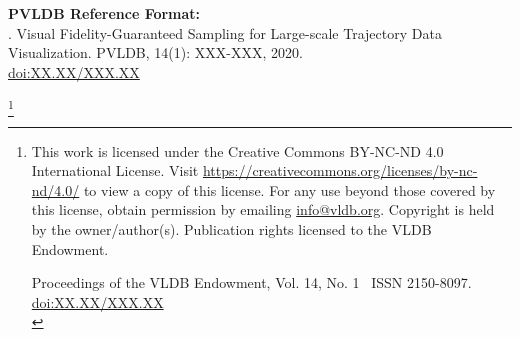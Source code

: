 \documentclass[sigconf, nonacm]{acmart}
\newcommand\vldbdoi{XX.XX/XXX.XX}
\newcommand\vldbpages{XXX-XXX}
\newcommand\vldbvolume{14}
\newcommand\vldbissue{1}
\newcommand\vldbyear{2020}
\newcommand{\trim}{\vspace{-2mm}}
\begin{document}
\maketitle

\trim \trim

\begingroup\small\noindent\raggedright\textbf{PVLDB Reference Format:}\\
\shortauthors. Visual Fidelity-Guaranteed Sampling for Large-scale Trajectory Data Visualization. PVLDB, \vldbvolume(\vldbissue): \vldbpages, \vldbyear.\\
\href{https://doi.org/\vldbdoi}{doi:\vldbdoi}
\endgroup

\trim \trim %

\begingroup
\renewcommand\thefootnote{}\footnote{\noindent
This work is licensed under the Creative Commons BY-NC-ND 4.0 International License. Visit \url{https://creativecommons.org/licenses/by-nc-nd/4.0/} to view a copy of this license. For any use beyond those covered by this license, obtain permission by emailing \href{mailto:info@vldb.org}{info@vldb.org}. Copyright is held by the owner/author(s). Publication rights licensed to the VLDB Endowment. \\
\raggedright Proceedings of the VLDB Endowment, Vol. \vldbvolume, No. \vldbissue\ %
ISSN 2150-8097. \\
\href{https://doi.org/\vldbdoi}{doi:\vldbdoi} \\
}\addtocounter{footnote}{-1}\endgroup



\trim
















\end{document}
